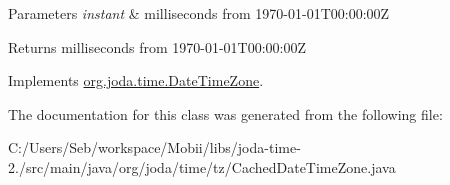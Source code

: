 \begin{DoxyParams}{Parameters}
{\em instant} & milliseconds from 1970-\/01-\/01\-T00\-:00\-:00\-Z \\
\hline
\end{DoxyParams}
\begin{DoxyReturn}{Returns}
milliseconds from 1970-\/01-\/01\-T00\-:00\-:00\-Z 
\end{DoxyReturn}


Implements \hyperlink{classorg_1_1joda_1_1time_1_1_date_time_zone_abdb3c6d6191fdd441248a7ea8ca302d0}{org.\-joda.\-time.\-Date\-Time\-Zone}.



The documentation for this class was generated from the following file\-:\begin{DoxyCompactItemize}
\item 
C\-:/\-Users/\-Seb/workspace/\-Mobii/libs/joda-\/time-\/2./src/main/java/org/joda/time/tz/Cached\-Date\-Time\-Zone.\-java\end{DoxyCompactItemize}
